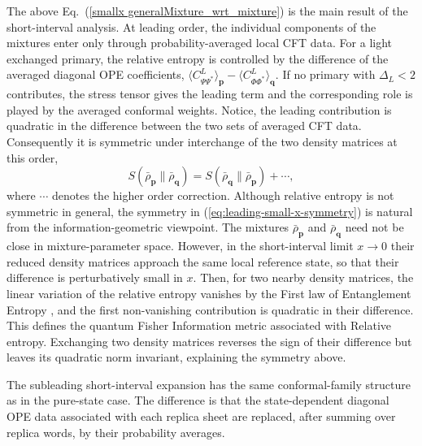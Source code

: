 \documentclass[11pt]{article}
\begin{document}
The above Eq.~(\ref{smallx generalMixture_wrt_mixture}) is the main result of
the short-interval analysis. At leading order, the individual components of
the mixtures enter only through probability-averaged local CFT data. For a
light exchanged primary, the relative entropy is controlled by the difference
of the averaged diagonal OPE coefficients,
$\langle C^L_{\Psi\Psi^*}\rangle_{\mathbf p}
-\langle C^L_{\Phi\Phi^*}\rangle_{\mathbf q}$. If no primary with $\Delta_L<2$ contributes, the stress tensor gives the
leading term and the corresponding role is played by the averaged conformal
weights.
Notice, 
the leading contribution is quadratic in the difference between the two sets
of averaged CFT data. Consequently it is symmetric under interchange of the
two density matrices at this order,
\begin{equation}\label{eq:leading-small-x-symmetry}
S(\bar\rho_{\mathbf p}\|\bar\rho_{\mathbf q})
=
S(\bar\rho_{\mathbf q}\|\bar\rho_{\mathbf p})
+\cdots,
\end{equation}
where $\cdots$ denotes the higher order correction. 
Although relative entropy is not symmetric in general, the
symmetry in (\ref{eq:leading-small-x-symmetry}) is natural from the
information-geometric viewpoint. The mixtures $\bar \rho_{\textbf{p}}$ and $\bar \rho_{\textbf{q}}$ need not be close in mixture-parameter space. However, in the short-interval limit $x\to 0$ their reduced density matrices approach the same local reference state, so that their difference is perturbatively small in $x$. Then, for two nearby density matrices, the linear variation of the relative entropy vanishes by the First law of Entanglement Entropy \cite{Blanco_2013}, and the first non-vanishing contribution is quadratic in their difference. This defines the quantum Fisher Information metric associated with Relative entropy. Exchanging two density matrices reverses the sign of their difference but leaves its quadratic norm invariant, explaining the symmetry above. 

The subleading short-interval expansion has the same conformal-family
structure as in the pure-state case. The difference is that the
state-dependent diagonal OPE data associated with each replica sheet are
replaced, after summing over replica words, by their probability averages.
\end{document}
